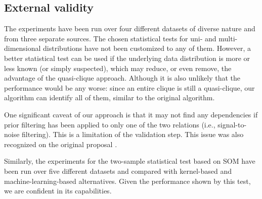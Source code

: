 \subsection{External validity}
The \PresQ experiments have been run over four different datasets of
diverse nature and from three separate sources. The chosen statistical tests for
uni- and multi-dimensional distributions have not been customized to any of them.
However, a better statistical test can be used if the underlying data distribution is more or
less known (or simply suspected), which may reduce, or even remove, the advantage of the
quasi-clique approach. Although it is also unlikely that the performance would be any worse:
since an entire clique is still a quasi-clique, our algorithm can identify all of them,
similar to the original \Find algorithm.

One significant caveat of our approach is that it may not find
any dependencies if prior filtering has been applied to only one of the two relations
(i.e., signal-to-noise filtering). This is a limitation of the validation
step. This issue was also recognized on the original \Find proposal \cite{koeller2003discovery}.

\medskip

Similarly, the experiments for the two-sample statistical test based on \gls{SOM}
have been run over five different datasets and compared with kernel-based and machine-learning-based
alternatives. Given the performance shown by this test, we are confident in
its capabilities.
